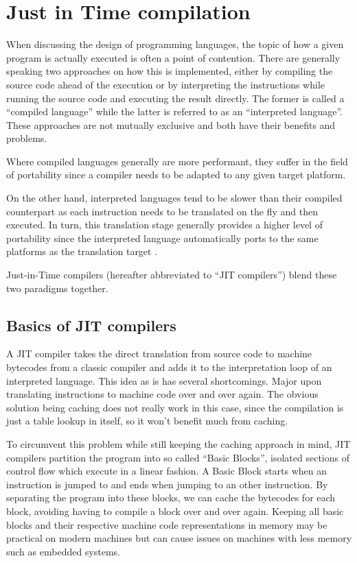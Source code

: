 \chapter{Just in Time compilation}\label{cha:chapter2}

When discussing the design of programming languages, the topic of how a given program is actually executed is often a point of contention. 
There are generally speaking two approaches on how this is implemented, either by compiling the source code ahead of the execution or by interpreting the instructions while running the source code and executing the result directly. 
The former is called a \enquote{compiled language} while the latter is referred to as an \enquote{interpreted language}. 
These approaches are not mutually exclusive and both have their benefits and problems. 

Where compiled languages generally are more performant, they suffer in the field of portability since a compiler needs to be adapted to any given target platform. 

On the other hand, interpreted languages tend to be slower than their compiled counterpart as each instruction needs to be translated on the fly and then executed. In turn, this translation stage generally provides a higher level of portability since the interpreted language automatically ports to the same platforms as the translation target \cite{aycock2003}.

Just-in-Time compilers (hereafter abbreviated to \enquote{JIT compilers}) blend these two paradigms together.

\section{Basics of JIT compilers}
A JIT compiler takes the direct translation from source code to machine bytecodes from a classic compiler and adds it to the interpretation loop of an interpreted language.
This idea as is has several shortcomings. Major upon translating instructions to machine code over and over again. The obvious solution being caching does not really work in this case, since the compilation is just a table lookup in itself, so it won't benefit much from caching.

To circumvent this problem while still keeping the caching approach in mind, JIT compilers partition the program into so called \enquote{Basic Blocks}, isolated sections of control flow which execute in a linear fashion. 
A Basic Block starts when an instruction is jumped to and ends when jumping to an other instruction. 
By separating the program into these blocks, we can cache the bytecodes for each block, avoiding having to compile a block over and over again. 
Keeping all basic blocks and their respective machine code representations in memory may be practical on modern machines but can cause issues on machines with less memory such as embedded systems.

